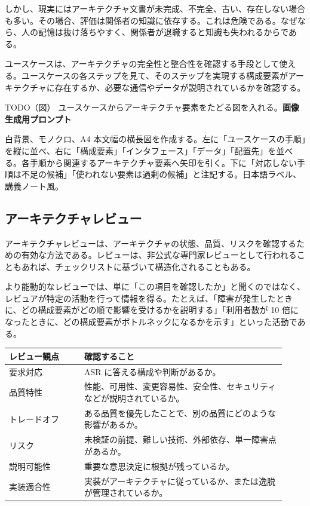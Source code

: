 \documentclass[a4paper,11pt]{ltjsarticle}
\newcommand{\todofig}[2]{\begin{statementbox}{TODO（図） #1}\textbf{画像生成用プロンプト}\par #2\end{statementbox}}
\begin{document}
しかし、現実にはアーキテクチャ文書が未完成、不完全、古い、存在しない場合も多い。その場合、評価は関係者の知識に依存する。これは危険である。なぜなら、人の記憶は抜け落ちやすく、関係者が退職すると知識も失われるからである。

ユースケースは、アーキテクチャの完全性と整合性を確認する手段として使える。ユースケースの各ステップを見て、そのステップを実現する構成要素がアーキテクチャに存在するか、必要な通信やデータが説明されているかを確認する。

\todofig{ユースケースからアーキテクチャ要素をたどる図を入れる。}{白背景、モノクロ、A4 本文幅の横長図を作成する。左に「ユースケースの手順」を縦に並べ、右に「構成要素」「インタフェース」「データ」「配置先」を並べる。各手順から関連するアーキテクチャ要素へ矢印を引く。下に「対応しない手順は不足の候補」「使われない要素は過剰の候補」と注記する。日本語ラベル、講義ノート風。}

\subsection{アーキテクチャレビュー}
アーキテクチャレビューは、アーキテクチャの状態、品質、リスクを確認するための有効な方法である。レビューは、非公式な専門家レビューとして行われることもあれば、チェックリストに基づいて構造化されることもある。

より能動的なレビューでは、単に「この項目を確認したか」と聞くのではなく、レビュアが特定の活動を行って情報を得る。たとえば、「障害が発生したときに、どの構成要素がどの順で影響を受けるかを説明する」「利用者数が 10 倍になったときに、どの構成要素がボトルネックになるかを示す」といった活動である。

\begin{longtable}{P{0.25\linewidth}P{0.67\linewidth}}
\toprule
レビュー観点 & 確認すること \\
\midrule
要求対応 & ASR に答える構成や判断があるか。 \\
品質特性 & 性能、可用性、変更容易性、安全性、セキュリティなどが説明されているか。 \\
トレードオフ & ある品質を優先したことで、別の品質にどのような影響があるか。 \\
リスク & 未検証の前提、難しい技術、外部依存、単一障害点があるか。 \\
説明可能性 & 重要な意思決定に根拠が残っているか。 \\
実装適合性 & 実装がアーキテクチャに従っているか、または逸脱が管理されているか。 \\
\bottomrule
\end{longtable}
\end{document}
